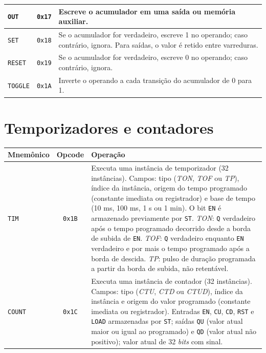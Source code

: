 \begin{quadrofixo}
\begin{tabular}{|l|c|p{9.4cm}|}
        \hline
        \texttt{OUT} & \texttt{0x17} & Escreve o acumulador em uma saída ou memória auxiliar. \\
        \hline
        \texttt{SET} & \texttt{0x18} & Se o acumulador for verdadeiro, escreve 1 no operando; caso contrário, ignora. Para saídas, o valor é retido entre varreduras. \\
        \hline
        \texttt{RESET} & \texttt{0x19} & Se o acumulador for verdadeiro, escreve 0 no operando; caso contrário, ignora. \\
        \hline
        \texttt{TOGGLE} & \texttt{0x1A} & Inverte o operando a cada transição do acumulador de 0 para 1. \\
        \hline
    \end{tabular}
    \label{qua:ape-bit}
\end{quadrofixo}

\section{Temporizadores e contadores}
\label{sec:ape-isa-tc}

\begin{quadrofixo}
    \centering
    \begin{tabular}{|l|c|p{9.4cm}|}
        \hline
        Mnemônico & Opcode & Operação \\
        \hline
        \texttt{TIM} & \texttt{0x1B} & Executa uma instância de temporizador (32 instâncias). Campos: tipo (\textit{TON}, \textit{TOF} ou \textit{TP}), índice da instância, origem do tempo programado (constante imediata ou registrador) e base de tempo (10 ms, 100 ms, 1 s ou 1 min). O bit \texttt{EN} é armazenado previamente por \texttt{ST}. \textit{TON}: \texttt{Q} verdadeiro após o tempo programado decorrido desde a borda de subida de \texttt{EN}. \textit{TOF}: \texttt{Q} verdadeiro enquanto \texttt{EN} verdadeiro e por mais o tempo programado após a borda de descida. \textit{TP}: pulso de duração programada a partir da borda de subida, não retentável. \\
        \hline
        \texttt{COUNT} & \texttt{0x1C} & Executa uma instância de contador (32 instâncias). Campos: tipo (\textit{CTU}, \textit{CTD} ou \textit{CTUD}), índice da instância e origem do valor programado (constante imediata ou registrador). Entradas \texttt{EN}, \texttt{CU}, \texttt{CD}, \texttt{RST} e \texttt{LOAD} armazenadas por \texttt{ST}; saídas \texttt{QU} (valor atual maior ou igual ao programado) e \texttt{QD} (valor atual não positivo); valor atual de 32 \textit{bits} com sinal. \\
        \hline
    \end{tabular}
    \label{qua:ape-tc}
\end{quadrofixo}


